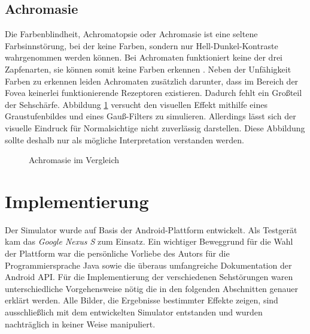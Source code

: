 \documentclass[a4paper]{article}
\begin{document}
\subsection*{Achromasie}
Die Farbenblindheit, Achromatopsie oder Achromasie ist eine seltene Farbsinnstörung, bei der keine Farben, sondern nur Hell-Dunkel-Kontraste wahrgenommen werden können. Bei Achromaten funktioniert keine der drei Zapfenarten, sie können somit keine Farben erkennen \cite{WP-A}. Neben der Unfähigkeit Farben zu erkennen leiden Achromaten zusätzlich darunter, dass im Bereich der Fovea keinerlei funktionierende Rezeptoren existieren. Dadurch fehlt ein Großteil der Sehschärfe. Abbildung \ref{achromate} versucht den visuellen Effekt mithilfe eines Graustufenbildes und eines Gauß-Filters zu simulieren. Allerdings lässt sich der visuelle Eindruck für Normalsichtige nicht zuverlässig darstellen. Diese Abbildung sollte deshalb nur als mögliche Interpretation verstanden werden.

\begin{figure}[H]
\centering
{}
\caption{Achromasie im Vergleich}
\label{achromate}
\end{figure}

\newpage

\section*{Implementierung}
Der Simulator wurde auf Basis der Android-Plattform entwickelt. Als Testgerät kam das \textit{Google Nexus S} zum Einsatz. Ein wichtiger Beweggrund für die Wahl der Plattform war die persönliche Vorliebe des Autors für die Programmiersprache Java sowie die überaus umfangreiche Dokumentation der Android API. Für die Implementierung der verschiedenen Sehstörungen waren  unterschiedliche Vorgehensweise nötig die in den folgenden Abschnitten genauer erklärt werden. Alle Bilder, die Ergebnisse bestimmter Effekte zeigen, sind ausschließlich mit dem entwickelten Simulator entstanden und wurden nachträglich in keiner Weise manipuliert.
\end{document}
